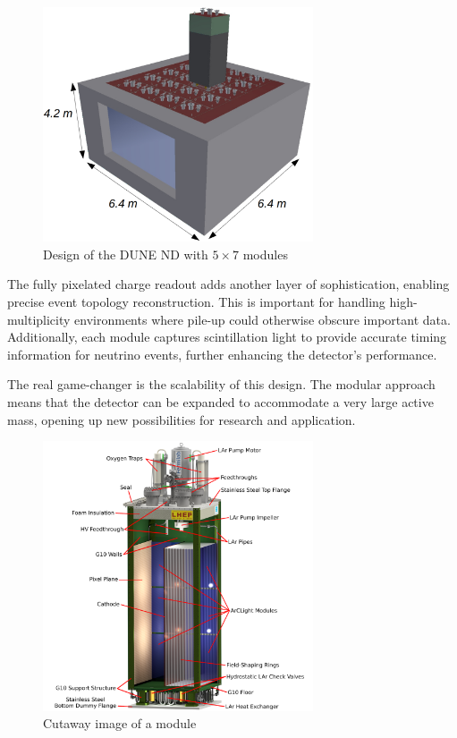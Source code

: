 \begin{figure}[H]
  \centering
  \includegraphics[width=80mm]{figures/nd.png}
  \caption{Design of the DUNE ND with $5 \times 7$ modules}
  \label{nd}
\end{figure}

The fully pixelated charge readout adds another layer of sophistication, enabling precise event topology reconstruction.
This is important for handling high-multiplicity environments where pile-up could otherwise obscure important data.
Additionally, each module captures scintillation light to provide accurate timing information for neutrino events, further enhancing the detector's performance.

The real game-changer is the scalability of this design.
The modular approach means that the detector can be expanded to accommodate a very large active mass, opening up new possibilities for research and application.

\begin{figure}[H]
  \centering
  \includegraphics[width=80mm]{figures/ndModule.png}
  \caption{Cutaway image of a module}
  \label{ndModule}
\end{figure}

